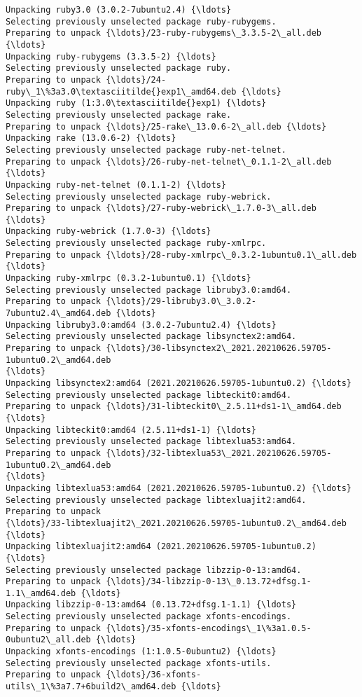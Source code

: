 \documentclass[11pt]{article}
\begin{document}
\begin{Verbatim}[commandchars=\\\{\}]
Unpacking ruby3.0 (3.0.2-7ubuntu2.4) {\ldots}
Selecting previously unselected package ruby-rubygems.
Preparing to unpack {\ldots}/23-ruby-rubygems\_3.3.5-2\_all.deb {\ldots}
Unpacking ruby-rubygems (3.3.5-2) {\ldots}
Selecting previously unselected package ruby.
Preparing to unpack {\ldots}/24-ruby\_1\%3a3.0\textasciitilde{}exp1\_amd64.deb {\ldots}
Unpacking ruby (1:3.0\textasciitilde{}exp1) {\ldots}
Selecting previously unselected package rake.
Preparing to unpack {\ldots}/25-rake\_13.0.6-2\_all.deb {\ldots}
Unpacking rake (13.0.6-2) {\ldots}
Selecting previously unselected package ruby-net-telnet.
Preparing to unpack {\ldots}/26-ruby-net-telnet\_0.1.1-2\_all.deb {\ldots}
Unpacking ruby-net-telnet (0.1.1-2) {\ldots}
Selecting previously unselected package ruby-webrick.
Preparing to unpack {\ldots}/27-ruby-webrick\_1.7.0-3\_all.deb {\ldots}
Unpacking ruby-webrick (1.7.0-3) {\ldots}
Selecting previously unselected package ruby-xmlrpc.
Preparing to unpack {\ldots}/28-ruby-xmlrpc\_0.3.2-1ubuntu0.1\_all.deb {\ldots}
Unpacking ruby-xmlrpc (0.3.2-1ubuntu0.1) {\ldots}
Selecting previously unselected package libruby3.0:amd64.
Preparing to unpack {\ldots}/29-libruby3.0\_3.0.2-7ubuntu2.4\_amd64.deb {\ldots}
Unpacking libruby3.0:amd64 (3.0.2-7ubuntu2.4) {\ldots}
Selecting previously unselected package libsynctex2:amd64.
Preparing to unpack {\ldots}/30-libsynctex2\_2021.20210626.59705-1ubuntu0.2\_amd64.deb
{\ldots}
Unpacking libsynctex2:amd64 (2021.20210626.59705-1ubuntu0.2) {\ldots}
Selecting previously unselected package libteckit0:amd64.
Preparing to unpack {\ldots}/31-libteckit0\_2.5.11+ds1-1\_amd64.deb {\ldots}
Unpacking libteckit0:amd64 (2.5.11+ds1-1) {\ldots}
Selecting previously unselected package libtexlua53:amd64.
Preparing to unpack {\ldots}/32-libtexlua53\_2021.20210626.59705-1ubuntu0.2\_amd64.deb
{\ldots}
Unpacking libtexlua53:amd64 (2021.20210626.59705-1ubuntu0.2) {\ldots}
Selecting previously unselected package libtexluajit2:amd64.
Preparing to unpack
{\ldots}/33-libtexluajit2\_2021.20210626.59705-1ubuntu0.2\_amd64.deb {\ldots}
Unpacking libtexluajit2:amd64 (2021.20210626.59705-1ubuntu0.2) {\ldots}
Selecting previously unselected package libzzip-0-13:amd64.
Preparing to unpack {\ldots}/34-libzzip-0-13\_0.13.72+dfsg.1-1.1\_amd64.deb {\ldots}
Unpacking libzzip-0-13:amd64 (0.13.72+dfsg.1-1.1) {\ldots}
Selecting previously unselected package xfonts-encodings.
Preparing to unpack {\ldots}/35-xfonts-encodings\_1\%3a1.0.5-0ubuntu2\_all.deb {\ldots}
Unpacking xfonts-encodings (1:1.0.5-0ubuntu2) {\ldots}
Selecting previously unselected package xfonts-utils.
Preparing to unpack {\ldots}/36-xfonts-utils\_1\%3a7.7+6build2\_amd64.deb {\ldots}

\end{Verbatim}
\end{document}
